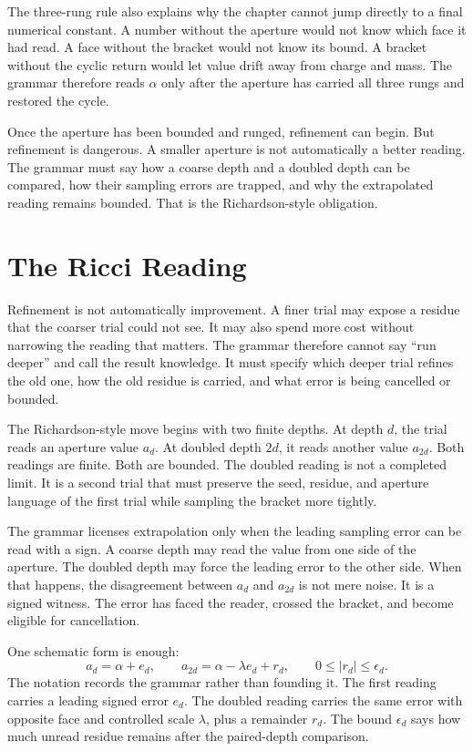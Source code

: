 The three-rung rule also explains why the chapter cannot jump directly to a
final numerical constant. A number without the aperture would not know which
face it had read. A face without the bracket would not know its bound. A
bracket without the cyclic return would let value drift away from charge and
mass. The grammar therefore reads \(\alpha\) only after the aperture has
carried all three rungs and restored the cycle.

Once the aperture has been bounded and runged, refinement can begin. But
refinement is dangerous. A smaller aperture is not automatically a better
reading. The grammar must say how a coarse depth and a doubled depth can be
compared, how their sampling errors are trapped, and why the extrapolated
reading remains bounded. That is the Richardson-style obligation.

\section{The Ricci Reading}

Refinement is not automatically improvement. A finer trial may expose a
residue that the coarser trial could not see. It may also spend more cost
without narrowing the reading that matters. The grammar therefore cannot say
``run deeper'' and call the result knowledge. It must specify which deeper
trial refines the old one, how the old residue is carried, and what error is
being cancelled or bounded.

The Richardson-style move begins with two finite depths. At depth \(d\), the
trial reads an aperture value \(a_d\). At doubled depth \(2d\), it reads
another value \(a_{2d}\). Both readings are finite. Both are bounded. The
doubled reading is not a completed limit. It is a second trial that must
preserve the seed, residue, and aperture language of the first trial while
sampling the bracket more tightly.

The grammar licenses extrapolation only when the leading sampling error can
be read with a sign. A coarse depth may read the value from one side of the
aperture. The doubled depth may force the leading error to the other side.
When that happens, the disagreement between \(a_d\) and \(a_{2d}\) is not
mere noise. It is a signed witness. The error has faced the reader, crossed
the bracket, and become eligible for cancellation.

One schematic form is enough:
\[
  a_d = \alpha + e_d,
  \qquad
  a_{2d} = \alpha - \lambda e_d + r_d,
  \qquad
  0 \leq |r_d| \leq \epsilon_d .
\]
The notation records the grammar rather than founding it. The first reading
carries a leading signed error \(e_d\). The doubled reading carries the same
error with opposite face and controlled scale \(\lambda\), plus a remainder
\(r_d\). The bound \(\epsilon_d\) says how much unread residue remains after
the paired-depth comparison.

